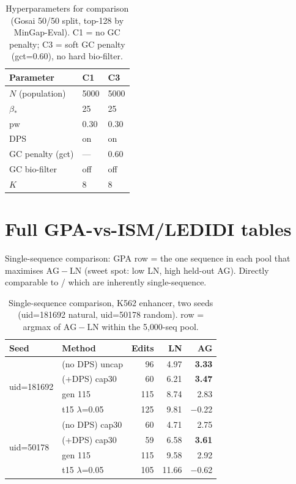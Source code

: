 \begin{table}[h]
\caption{Hyperparameters for \dnacraft{} comparison (Gosai 50/50 split, top-128 by MinGap-Eval). C1 = no GC penalty; C3 = soft GC penalty (gct=0.60), no hard bio-filter.}
\label{tab:hyper-dnacraft}
\centering
\small
\begin{tabular}{lll}
\toprule
Parameter & C1 & C3 \\
\midrule
$N$ (population) & 5000 & 5000 \\
$\beta_*$ & 25 & 25 \\
$\mathrm{pw}$ & 0.30 & 0.30 \\
DPS & on & on \\
GC penalty (gct) & --- & 0.60 \\
GC bio-filter & off & off \\
$K$ & 8 & 8 \\
\bottomrule
\end{tabular}
\end{table}

\section{Full GPA-vs-ISM/LEDIDI tables}\label{app:ism_full}

Single-sequence comparison: GPA row = the one sequence in each pool that maximises $\mathrm{AG}-\mathrm{LN}$ (sweet spot: low LN, high held-out AG). Directly comparable to \ism{}/\ledidi{} which are inherently single-sequence.

\begin{table}[h]
\caption{Single-sequence comparison, K562 enhancer, two seeds (uid=181692 natural, uid=50178 random). \gpa{} row = argmax of $\mathrm{AG}-\mathrm{LN}$ within the 5{,}000-seq pool.}
\label{tab:ism_singleseq}
\centering
\small
\begin{tabular}{llrrr}
\toprule
Seed & Method & Edits & LN & AG \\
\midrule
\multirow{4}{*}{uid=181692}
 & \gpa{} (no DPS) uncap   &  96 & 4.97 & \textbf{3.33} \\
 & \gpa{} (+DPS) cap30     &  60 & 6.21 & \textbf{3.47} \\
 & \ism{} gen 115          & 115 & 8.74 & 2.83 \\
 & \ledidi{} t15 $\lambda$=0.05 & 125 & 9.81 & $-$0.22 \\
\midrule
\multirow{4}{*}{uid=50178}
 & \gpa{} (no DPS) cap30   &  60 & 4.71 & 2.75 \\
 & \gpa{} (+DPS) cap30     &  59 & 6.58 & \textbf{3.61} \\
 & \ism{} gen 115          & 115 & 9.58 & 2.92 \\
 & \ledidi{} t15 $\lambda$=0.05 & 105 &11.66 & $-$0.62 \\
\bottomrule
\end{tabular}
\end{table}

